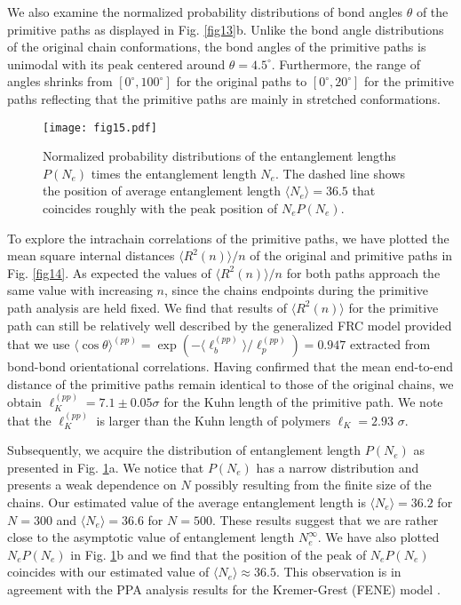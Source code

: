 \documentclass[pre,showpacs,notitlepage,twocolumn]{revtex4-1}
\begin{document}
 We also examine the normalized probability distributions of bond angles $\theta$ of the primitive paths as displayed in Fig. \ref{fig13}b.
Unlike the bond angle distributions of the original chain conformations, the bond angles of the primitive paths is unimodal with its peak centered around $\theta=4.5^{\circ}$. Furthermore, the range of angles
shrinks from $[0^{\circ},100^{\circ}]$ for the original paths to $[0^{\circ},20^{\circ}]$ for the primitive paths reflecting that the primitive paths are mainly in stretched conformations.
%
 \begin{figure}[t]
\texttt{[image: fig15.pdf]}
\caption{ Normalized probability distributions of the entanglement lengths $ P(N_e)$ times the entanglement length $N_e$.  
 The dashed line shows the position of average entanglement length $\langle N_e \rangle = 36.5 $ that coincides roughly with the peak position of $N_e P(N_e)$.
  }
\label{fig15} 
\end{figure}
%

To explore the intrachain correlations of the primitive paths, we have plotted  the mean square internal distances $\langle R^2(n)\rangle/n$ of
the original and  primitive paths in Fig. \ref{fig14}. As expected the values  of $\langle R^2(n)\rangle/n$ for
both paths approach the same value with increasing $n$, since the  chains endpoints  during the primitive path analysis are held fixed. We find that results of $\langle R^2(n) \rangle$
for the primitive path can still be relatively well described by the generalized FRC model provided that we use  $ \langle \cos \theta \rangle^{(pp)}= \exp(-\langle \ell_b^{(pp)}\rangle/\ell_p^{(pp)})=0.947 $ extracted
from bond-bond orientational correlations. Having confirmed that the mean end-to-end distance of the primitive paths remain  identical to those of the original chains, we obtain $\ell_K^{(pp)}=7.1 \pm 0.05 \sigma$   for  the Kuhn length of 
the primitive path. We note that the $\ell_K^{(pp)}$ is  larger than the Kuhn length of polymers $\ell_K=2.93$ $\sigma$.


Subsequently, we  acquire the distribution of entanglement length $P (N_e)$ as presented in Fig. \ref{fig15}a. We notice that
$P (N_e)$  has a narrow distribution and  presents a weak dependence on $N$ possibly resulting from the finite size of the chains. 
Our estimated value of the average entanglement length  is $\langle N_e \rangle = 36.2 $ for $N=300$  and $\langle N_e \rangle = 36.6 $ for $N=500$. These results suggest that
we are rather close to the asymptotic value of entanglement length $N_e^{\infty}$.
 We have also plotted $N_e P (N_e)$ in Fig. \ref{fig15}b and we find that the position of the peak of $N_e P (N_e)$  coincides with our estimated value of  $\langle N_e \rangle \approx 36.5$.
This observation is in agreement with the PPA analysis results for the Kremer-Grest (FENE) model \cite{Kremer2016}.
\end{document}
